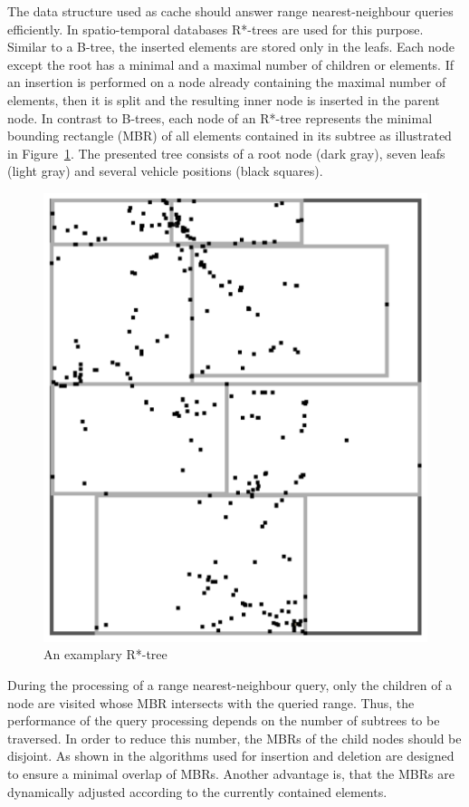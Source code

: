 The data structure used as cache should answer range nearest-neighbour
queries efficiently. In spatio-temporal databases R*-trees
\cite{Beckmann1990TRA} are used for this purpose. Similar to a B-tree,
the inserted elements are stored only in the leafs. Each node except
the root has a minimal and a maximal number of children or
elements. If an insertion is performed on a node already containing
the maximal number of elements, then it is split and the resulting
inner node is inserted in the parent node. In contrast to B-trees,
each node of an R*-tree represents the minimal bounding rectangle
(MBR) of all elements contained in its subtree as illustrated in
Figure~\ref{fig:Rtree}. The presented tree consists of a root node
(dark gray), seven leafs (light gray) and several vehicle positions
(black squares).

\begin{figure}[htbp]
\centering
\includegraphics[scale=0.3,angle=90]{img/dgm/rTree.pdf}
\caption{An examplary R*-tree}\label{fig:Rtree}
\end{figure}

During the processing of a range nearest-neighbour query, only the
children of a node are visited whose MBR intersects with the queried
range. Thus, the performance of the query processing depends on the
number of subtrees to be traversed. In order to reduce this number,
the MBRs of the child nodes should be disjoint. As shown in
\cite{Beckmann1990TRA} the algorithms used for insertion and deletion
are designed to ensure a minimal overlap of MBRs. Another advantage
is, that the MBRs are dynamically adjusted according to the currently
contained elements.

